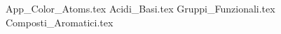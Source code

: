 \begin{appendices}
{App_Color_Atoms.tex}
{Acidi_Basi.tex}
{Gruppi_Funzionali.tex}
{Composti_Aromatici.tex}
\end{appendices}
